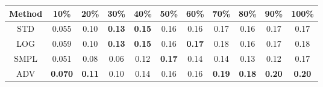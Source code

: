 \documentclass{standalone}
\begin{document}
\begin{tabular}{c|cccccccccc}
      \toprule
      Method & 10\% & 20\% & 30\% & 40\% & 50\% & 60\% & 70\% & 80\% & 90\% & 100\% \\
      \midrule
STD & 0.055 & 0.10 & \textbf{0.13} & \textbf{0.15} & 0.16 & 0.16 & 0.17 & 0.16 & 0.17 & 0.17\\
LOG & 0.059 & 0.10 & \textbf{0.13} & \textbf{0.15} & 0.16 & \textbf{0.17} & 0.18 & 0.16 & 0.17 & 0.18\\
SMPL & 0.051 & 0.08 & 0.06 & 0.12 & \textbf{0.17} & 0.14 & 0.14 & 0.13 & 0.12 & 0.17\\
ADV & \textbf{0.070} & \textbf{0.11} & 0.10 & 0.14 & 0.16 & 0.16 & \textbf{0.19} & \textbf{0.18} & \textbf{0.20} & \textbf{0.20}\\
  \bottomrule
\end{tabular}
\end{document}
